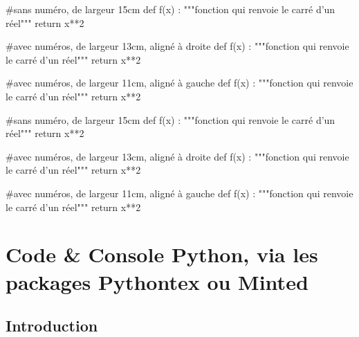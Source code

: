 \documentclass{article}
\begin{document}
\begin{codetex}
\begin{envcodepiton}[Lignes=false,Largeur=15cm]
#sans numéro, de largeur 15cm
def f(x) :
	"""fonction qui renvoie le carré d'un réel"""
	return x**2
\end{envcodepiton}

\begin{envcodepiton}[Alignement=flush right,Largeur=13cm]
#avec numéros, de largeur 13cm, aligné à droite
def f(x) :
	"""fonction qui renvoie le carré d'un réel"""
	return x**2
\end{envcodepiton}

\begin{envcodepiton}[Alignement=flush left,Largeur=11cm]
#avec numéros, de largeur 11cm, aligné à gauche
def f(x) :
	"""fonction qui renvoie le carré d'un réel"""
	return x**2
\end{envcodepiton}
\end{codetex}

\begin{codesortie}
\begin{envcodepiton}[Lignes=false,Largeur=15cm]
#sans numéro, de largeur 15cm
def f(x) :
	"""fonction qui renvoie le carré d'un réel"""
	return x**2
\end{envcodepiton}

\begin{envcodepiton}[Alignement=flush right,Largeur=13cm]
#avec numéros, de largeur 13cm, aligné à droite
def f(x) :
	"""fonction qui renvoie le carré d'un réel"""
	return x**2
\end{envcodepiton}

\begin{envcodepiton}[Alignement=flush left,Largeur=11cm]
#avec numéros, de largeur 11cm, aligné à gauche
def f(x) :
	"""fonction qui renvoie le carré d'un réel"""
	return x**2
\end{envcodepiton}
\end{codesortie}

\pagebreak

\section{Code \& Console Python, via les packages Pythontex ou Minted}

\subsection{Introduction}
\end{document}
